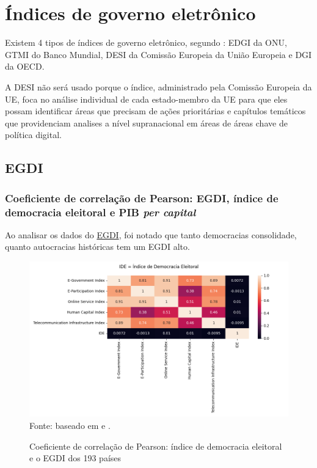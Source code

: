 \section{Índices de governo eletrônico}

Existem 4 tipos de índices de governo eletrônico, segundo \cite{martinez2022egovernment}: EDGI da ONU, GTMI do Banco Mundial, DESI da Comissão Europeia da União Europeia e DGI da OECD.

A DESI não será usado porque o índice, administrado pela Comissão Europeia da UE, foca no análise individual de cada estado-membro da UE para que eles possam identificar áreas que precisam de ações prioritárias e capítulos temáticos que providenciam analises a nível supranacional em áreas de áreas chave de política digital.

\subsection{EGDI}


\subsubsection{Coeficiente de correlação de Pearson: EGDI, índice de democracia eleitoral e PIB \textit{per capital}}

Ao analisar os dados do \href{https://publicadministration.un.org/egovkb/en-us/About/Overview/-E-Government-Development-Index}{EGDI}, foi notado que tanto democracias consolidade, quanto autocracias históricas tem um EGDI alto. 

\begin{figure}[H]
    \centering
    \caption{Coeficiente de correlação de Pearson: índice de democracia eleitoral e o EGDI dos 193 países}
    \includegraphics[width=1\linewidth]{figuras/egdi/correlacao3.png}
    \label{fig:correlacao3}
    \footnotesize{Fonte: baseado em \cite{ONU_edgi_mapa} e \cite{electoral_democracy_index}.}
\end{figure}

